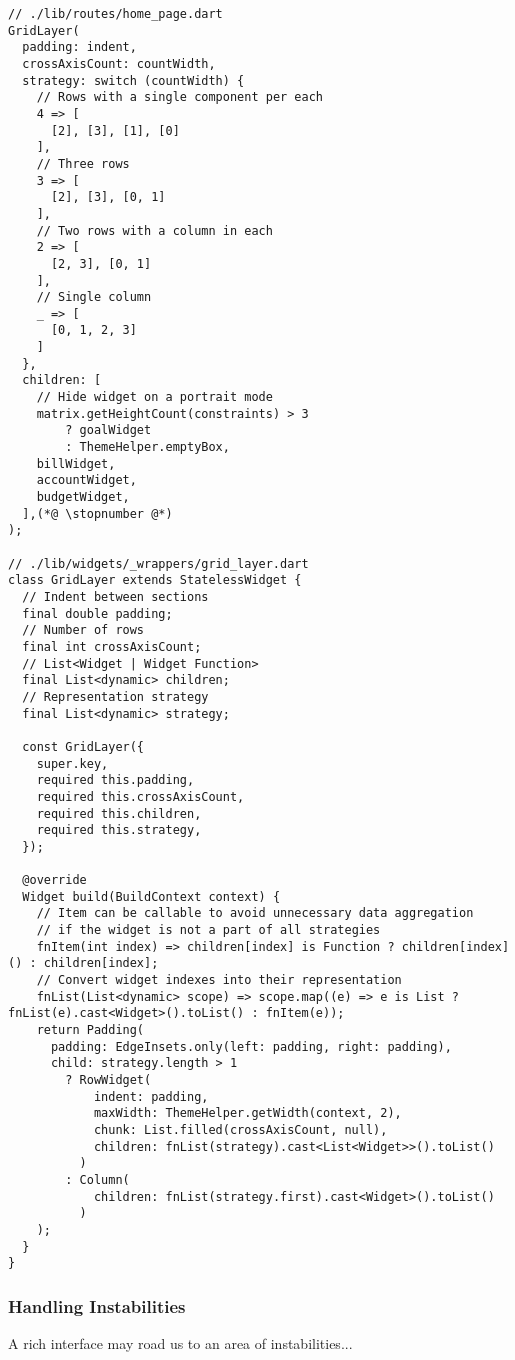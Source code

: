 \begin{lstlisting}
// ./lib/routes/home_page.dart
GridLayer(
  padding: indent,
  crossAxisCount: countWidth,
  strategy: switch (countWidth) {
    // Rows with a single component per each
    4 => [
      [2], [3], [1], [0]
    ],
    // Three rows
    3 => [
      [2], [3], [0, 1]
    ],
    // Two rows with a column in each
    2 => [
      [2, 3], [0, 1]
    ],
    // Single column
    _ => [
      [0, 1, 2, 3]
    ]
  },
  children: [
    // Hide widget on a portrait mode
    matrix.getHeightCount(constraints) > 3
        ? goalWidget
        : ThemeHelper.emptyBox,
    billWidget,
    accountWidget,
    budgetWidget,
  ],(*@ \stopnumber @*)
);

// ./lib/widgets/_wrappers/grid_layer.dart
class GridLayer extends StatelessWidget {
  // Indent between sections
  final double padding;
  // Number of rows
  final int crossAxisCount;
  // List<Widget | Widget Function>
  final List<dynamic> children;
  // Representation strategy
  final List<dynamic> strategy;

  const GridLayer({
    super.key,
    required this.padding,
    required this.crossAxisCount,
    required this.children,
    required this.strategy,
  });

  @override
  Widget build(BuildContext context) {
    // Item can be callable to avoid unnecessary data aggregation
    // if the widget is not a part of all strategies
    fnItem(int index) => children[index] is Function ? children[index]() : children[index];
    // Convert widget indexes into their representation
    fnList(List<dynamic> scope) => scope.map((e) => e is List ? fnList(e).cast<Widget>().toList() : fnItem(e));
    return Padding(
      padding: EdgeInsets.only(left: padding, right: padding),
      child: strategy.length > 1
        ? RowWidget(
            indent: padding,
            maxWidth: ThemeHelper.getWidth(context, 2),
            chunk: List.filled(crossAxisCount, null),
            children: fnList(strategy).cast<List<Widget>>().toList()
          )
        : Column(
            children: fnList(strategy.first).cast<Widget>().toList()
          )
    );
  }
}
\end{lstlisting}


\subsubsection{Handling Instabilities}

A rich interface may road us to an area of instabilities...

